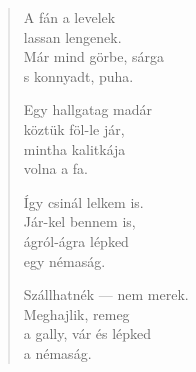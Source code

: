 \documentclass[11pt]{book}
\newcommand*{\centeredornament}{\centerline{\pgfornament[width=6cm]{88}}}
\begin{document}
\newpage

\vspace*{-15mm}
\centeredornament



\begin{verse}
  A fán a levelek \\
  lassan lengenek. \\
  Már mind görbe, sárga \\
  s konnyadt, puha.

  Egy hallgatag madár \\
  köztük föl-le jár, \\
  mintha kalitkája \\
  volna a fa.

  Így csinál lelkem is. \\
  Jár-kel bennem is, \\
  ágról-ágra lépked \\
  egy némaság.

  Szállhatnék --- nem merek. \\
  Meghajlik, remeg \\
  a gally, vár és lépked \\
  a némaság.
\end{verse}

\newpage

\vspace*{-15mm}
\centeredornament


\end{document}
